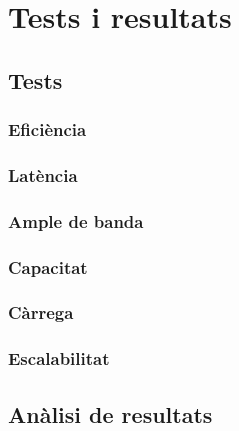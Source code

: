 \chapter{Tests i resultats}
\section{Tests}
\subsection{Eficiència}
\subsection{Latència}
\subsection{Ample de banda}
\subsection{Capacitat}
\subsection{Càrrega}
\subsection{Escalabilitat}
\section{Anàlisi de resultats}
